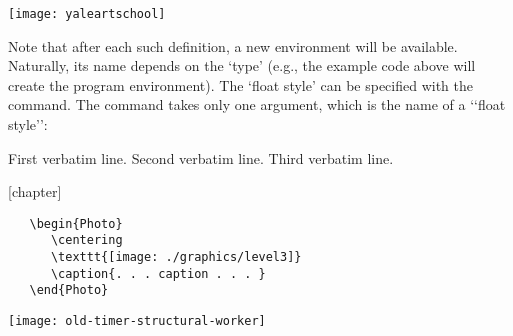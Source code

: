 \begin{Photo}
 \centering
 \texttt{[image: yaleartschool]}
\caption{. . . caption . . . }
\end{Photo}



Note that after each such definition, a new 
environment will be available. Naturally,
its name depends on the `type' (e.g., the example code above will create the program
environment). The `float style' can be specified with the  command. The
command takes only one argument, which is the name of a ‘‘float style’’:

\begin{teXXX}
\begin{Example}
     First verbatim line.
     Second verbatim line.
     Third verbatim line.
\end{Example}
\end{teXXX}



[chapter]

 \begin{Example}
 \begin{verbatim}
   \begin{Photo}
      \centering
      \texttt{[image: ./graphics/level3]}
      \caption{. . . caption . . . }
   \end{Photo}
\end{verbatim}
\caption{Example using verbatim code}
 \end{Example}

\begin{Photo}
 \centering
 \texttt{[image: old-timer-structural-worker]}
\caption{. . . caption . . . }
\end{Photo}

\newlength{\egwidth}\setlength{\egwidth}{0.48\textwidth}

\newenvironment{ega}%
{\begin{list}{}{\setlength{\leftmargin}{0.02\textwidth}%
\setlength{\rightmargin}{\leftmargin}}\item[]\footnotesize}%
{\end{list}}

\newenvironment{egbox}%
{\begin{minipage}[t]{\egwidth}}%
{\end{minipage}}

\newcommand{\egstart}{\begin{ega}\begin{egbox}}
\newcommand{\egmid}{\end{egbox}\hfill\begin{egbox}}
\newcommand{\egend}{\end{egbox}\end{ega}}

